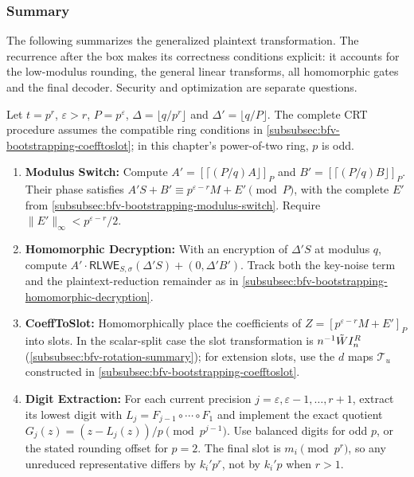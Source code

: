 \subsubsection{Summary}
\label{subsubsec:bfv-bootstrapping-summary}

The following summarizes the generalized plaintext transformation. The recurrence after the box makes its correctness conditions explicit: it accounts for the low-modulus rounding, the general linear transforms, all homomorphic gates and the final decoder. Security and optimization are separate questions.

\begin{tcolorbox}[title={\textbf{\tboxlabel{\ref*{subsubsec:bfv-bootstrapping-summary}} BFV Bootstrapping}}]
Let $t=p^r$, $\varepsilon>r$, $P=p^\varepsilon$, $\Delta=\lfloor q/p^r\rfloor$ and $\Delta'=\lfloor q/P\rfloor$. The complete CRT procedure assumes the compatible ring conditions in \autoref{subsubsec:bfv-bootstrapping-coefftoslot}; in this chapter's power-of-two ring, $p$ is odd.
\begin{enumerate}
\item \textbf{Modulus Switch:} Compute $A'=[\lceil(P/q)A\rfloor]_P$ and $B'=[\lceil(P/q)B\rfloor]_P$. Their phase satisfies $A'S+B'\equiv p^{\varepsilon-r}M+E'\pmod P$, with the complete $E'$ from \autoref{subsubsec:bfv-bootstrapping-modulus-switch}. Require $\|E'\|_\infty<p^{\varepsilon-r}/2$.
\item \textbf{Homomorphic Decryption:} With an encryption of $\Delta'S$ at modulus $q$, compute $A'\cdot\textsf{RLWE}_{S,\sigma}(\Delta'S)+(0,\Delta'B')$. Track both the key-noise term and the plaintext-reduction remainder as in \autoref{subsubsec:bfv-bootstrapping-homomorphic-decryption}.
\item \textbf{\textsf{CoeffToSlot}:} Homomorphically place the coefficients of $Z=[p^{\varepsilon-r}M+E']_P$ into slots. In the scalar-split case the slot transformation is $n^{-1}\tilde W I_n^R$ (\autoref{subsubsec:bfv-rotation-summary}); for extension slots, use the $d$ maps $\mathcal T_u$ constructed in \autoref{subsubsec:bfv-bootstrapping-coefftoslot}.
\item \textbf{Digit Extraction:} For each current precision $j=\varepsilon,\varepsilon-1,\ldots,r+1$, extract its lowest digit with $L_j=F_{j-1}\circ\cdots\circ F_1$ and implement the exact quotient $G_j(z)=(z-L_j(z))/p\pmod{p^{j-1}}$. Use balanced digits for odd $p$, or the stated rounding offset for $p=2$. The final slot is $m_i\pmod{p^r}$, so any unreduced representative differs by $k_i'p^r$, not by $k_i'p$ when $r>1$.

\end{enumerate}
\end{tcolorbox}
